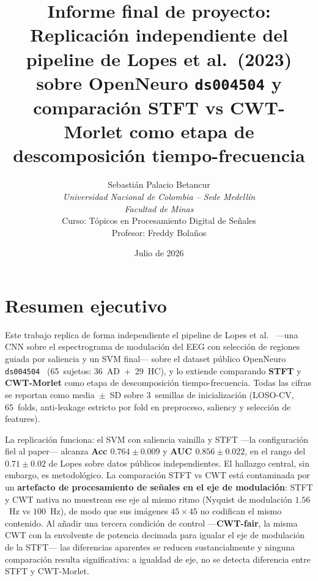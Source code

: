 \documentclass[11pt, a4paper]{article}
\title{
    \textbf{Informe final de proyecto:} \\[4pt]
    Replicación independiente del pipeline de Lopes et al.~(2023) sobre
    OpenNeuro \texttt{ds004504} y comparación STFT vs CWT-Morlet
    como etapa de descomposición tiempo-frecuencia
}
\author{
    Sebastián Palacio Betancur \\[6pt]
    \textit{Universidad Nacional de Colombia -- Sede Medellín} \\
    \textit{Facultad de Minas} \\[6pt]
    Curso: Tópicos en Procesamiento Digital de Señales \\
    Profesor: Freddy Bolaños
}
\date{Julio de 2026}
\begin{document}
\maketitle

\section*{Resumen ejecutivo}

Este trabajo replica de forma independiente el pipeline de Lopes
et al.~\cite{Lopes2023} ---una CNN sobre el espectrograma de modulación del
EEG con selección de regiones guiada por saliencia y un SVM final--- sobre
el dataset público OpenNeuro \texttt{ds004504}~\cite{Miltiadous2023}
(65~sujetos: 36~AD~+~29~HC), y lo extiende comparando \textbf{STFT} y
\textbf{CWT-Morlet} como etapa de descomposición tiempo-frecuencia. Todas
las cifras se reportan como media~$\pm$~SD sobre 3~semillas de
inicialización (LOSO-CV, 65~folds, anti-leakage estricto por fold en
preproceso, saliency y selección de features).

La replicación funciona: el SVM con saliencia vainilla y STFT ---la
configuración fiel al paper--- alcanza \textbf{Acc $0.764 \pm 0.009$} y
\textbf{AUC $0.856 \pm 0.022$}, en el rango del $0.71 \pm 0.02$ de Lopes
sobre datos públicos independientes. El hallazgo central, sin embargo, es
metodológico. La comparación STFT vs CWT está contaminada por un
\textbf{artefacto de procesamiento de señales en el eje de modulación}:
STFT y CWT nativa no muestrean ese eje al mismo ritmo (Nyquist de
modulación $1.56$~Hz vs $100$~Hz), de modo que sus imágenes $45\times45$ no
codifican el mismo contenido. Al añadir una tercera condición de control
---\textbf{CWT-fair}, la misma CWT con la envolvente de potencia decimada
para igualar el eje de modulación de la STFT--- las diferencias aparentes
se reducen sustancialmente y ninguna comparación resulta significativa: a
igualdad de eje, no se detecta diferencia entre STFT y CWT-Morlet.
\end{document}
